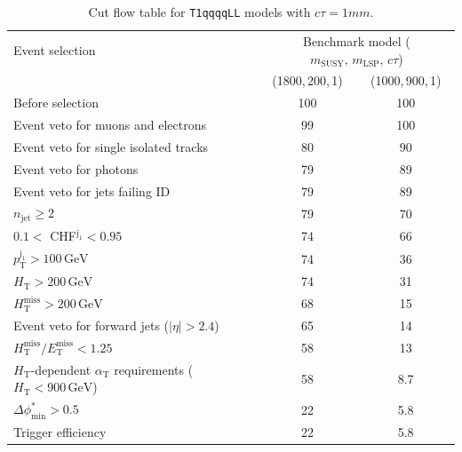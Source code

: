 \begin{table}[!h]
  \caption{Cut flow table for \texttt{T1qqqqLL} models with $c\tau = 1\unit{mm}$.} 
  \label{tab:cut_flow_ctau_1}
{\scriptsize%
\centering
\begin{tabular}{lcc}
  \hline
  Event selection & \multicolumn{2}{c}{Benchmark model ($m_\mathrm{SUSY},\,m_\mathrm{LSP},\,c\tau$)} \\
  \cline{2-3}
    & (1800,\,200,\,1) & (1000,\,900,\,1) \\
  \hline
  Before selection  & 100\phantom{.1} & 100\phantom{.1} \\
  Event veto for muons and electrons & \phantom{1}99\phantom{.1} & 100\phantom{.1} \\
  Event veto for single isolated tracks & \phantom{1}80\phantom{.1} & \phantom{1}90\phantom{.1} \\
  Event veto for photons & \phantom{1}79\phantom{.1} & \phantom{1}89\phantom{.1} \\
  Event veto for jets failing ID & \phantom{1}79\phantom{.1} & \phantom{1}89\phantom{.1} \\
   $n_{\mathrm{jet}} \geq 2$  & \phantom{1}79\phantom{.1} & \phantom{1}70\phantom{.1} \\
   $0.1 <$ CHF$^{\mathrm{j_1}} < 0.95$ & \phantom{1}74\phantom{.1} & \phantom{1}66\phantom{.1} \\
   $p_{\mathrm{T}}^{\mathrm{j_1}} > 100\,\mathrm{GeV}$ & \phantom{1}74\phantom{.1} & \phantom{1}36\phantom{.1} \\
   $H_{\mathrm{T}} > 200\,\mathrm{GeV}$  & \phantom{1}74\phantom{.1} & \phantom{1}31\phantom{.1} \\
  $H_{\mathrm{T}}^{\mathrm{miss}} > 200\,\mathrm{GeV}$  & \phantom{1}68\phantom{.1} & \phantom{1}15\phantom{.1} \\
  Event veto for forward jets ($|\eta| > 2.4$) & \phantom{1}65\phantom{.1} & \phantom{1}14\phantom{.1} \\
  $H_{\mathrm{T}}^{\mathrm{miss}} / E_{\mathrm{T}}^{\mathrm{miss}} < 1.25$ & \phantom{1}58\phantom{.1} & \phantom{1}13\phantom{.1} \\
  $H_{\mathrm{T}}$-dependent $\alpha_{\mathrm{T}}$ requirements ($H_{\mathrm{T}} < 900\,\mathrm{GeV}$)  & \phantom{1}58\phantom{.1} & \phantom{10}8.7 \\
  $\Delta\phi^{*}_{\mathrm{min}} > 0.5$  & \phantom{1}22\phantom{.1} & \phantom{10}5.8 \\
  Trigger efficiency & \phantom{1}22\phantom{.1} & \phantom{10}5.8  \\
  \hline
\end{tabular}
}
\end{table}

